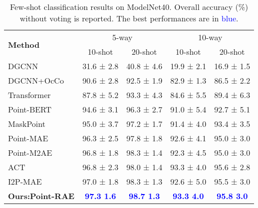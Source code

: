 \documentclass[sigconf, screen]{acmart}
\begin{document}
\begin{table}
\caption{
 Few-shot classification results on ModelNet40. Overall accuracy (\%) without voting is reported. The best performances are in \textcolor{blue}{blue}.
}
\centering
\setlength{\tabcolsep}{0.9mm}
\begin{tabular}{@{}lcccc}
\toprule[1pt]
\multirow{2}{*}{\textbf{Method}}& \multicolumn{2}{c}{{5-way}}& \multicolumn{2}{c}{{10-way}}\\
\cmidrule[0.5pt](lr){2-3} \cmidrule[0.5pt](lr){4-5}
& 10-shot & 20-shot & 10-shot & 20-shot\\
\midrule[0.5pt]
DGCNN \cite{wang2019dynamic} &31.6 ± 2.8 &40.8 ± 4.6 &19.9 ± 2.1 &16.9 ± 1.5 \\
DGCNN+OcCo\cite{wang2021unsupervised} & 90.6 ± 2.8 &92.5 ± 1.9 &82.9 ± 1.3 &86.5 ± 2.2 \\
Transformer \cite{vaswani2017attention} &87.8 ± 5.2 &93.3 ± 4.3 &84.6 ± 5.5 &89.4 ± 6.3\\
Point-BERT \cite{yu2022point} &94.6 ± 3.1 &96.3 ± 2.7 &91.0 ± 5.4 &92.7 ± 5.1\\
MaskPoint \cite{liu2022masked} &95.0 ± 3.7 &97.2 ± 1.7 &91.4 ± 4.0 &93.4 ± 3.5\\
Point-MAE \cite{pang2022masked} & 96.3 ± 2.5 &97.8 ± 1.8 &92.6 ± 4.1 &95.0 ± 3.0\\
Point-M2AE \cite{zhang2022masked} & 96.8 ± 1.8 &98.3 ± 1.4 &92.3 ± 4.5 &95.0 ± 3.0\\
ACT \cite{dong2022autoencoders} &96.8 ± 2.3 &98.0 ± 1.4 &93.3 ± 4.0 &95.6 ± 2.8\\
I2P-MAE \cite{zhang2022learning} &97.0 ± 1.8 &98.3 ± 1.3 &92.6 ± 5.0 &95.5 ± 3.0\\
\textbf{Ours:Point-RAE}  &\textcolor{blue}{\bf 97.3 1.6} &\textcolor{blue}{\bf 98.7 1.3} &\textcolor{blue}{\bf 93.3 4.0} &\textcolor{blue}{\bf 95.8 3.0}\\


\bottomrule[1pt]

\end{tabular}
\label{few-shot}
\end{table}
\end{document}
